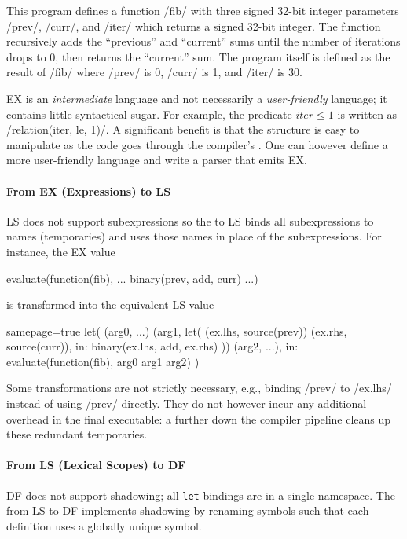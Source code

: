 \documentclass[main.tex]{subfiles}
\begin{document}
This program defines a function \iil/fib/ with three signed 32-bit integer parameters \iil/prev/, \iil/curr/, and \iil/iter/ which returns a signed 32-bit integer. The function recursively adds the \enquote{previous} and \enquote{current} sums until the number of iterations drops to 0, then returns the \enquote{current} sum. The program itself is defined as the result of \iil/fib/ where \iil/prev/ is 0, \iil/curr/ is 1, and \iil/iter/ is 30.

EX is an \emph{intermediate} language and not necessarily a \emph{user-friendly} language; it contains little syntactical sugar. For example, the predicate $ \textit{iter} \le 1 $ is written as \iil/relation(iter, le, 1)/. A significant benefit is that the structure is easy to manipulate as the code goes through the compiler's . One can however define a more user-friendly language and write a parser that emits EX.

\paragraph{From EX (Expressions) to LS} LS does not support subexpressions so the  to LS binds all subexpressions to names (temporaries) and uses those names in place of the subexpressions. For instance, the EX value 
\begin{il}
	evaluate(function(fib), ... binary(prev, add, curr) ...)
\end{il}
is transformed into the equivalent LS value
\begin{il*}{samepage=true}
	let(
		(arg0, ...) (arg1, let(
			(ex.lhs, source(prev)) (ex.rhs, source(curr)),
			in: binary(ex.lhs, add, ex.rhs)
		)) (arg2, ...),
		in: evaluate(function(fib), arg0 arg1 arg2)
	)
\end{il*}

Some transformations are not strictly necessary, e.g., binding \iil/prev/ to \iil/ex.lhs/ instead of using \iil/prev/ directly. They do not however incur any additional overhead in the final executable: a  further down the compiler pipeline cleans up these redundant temporaries.

\paragraph{From LS (Lexical Scopes) to DF} DF does not support shadowing; all \texttt{let} bindings are in a single namespace. The  from LS to DF implements shadowing by renaming symbols such that each definition uses a globally unique symbol.
\end{document}
